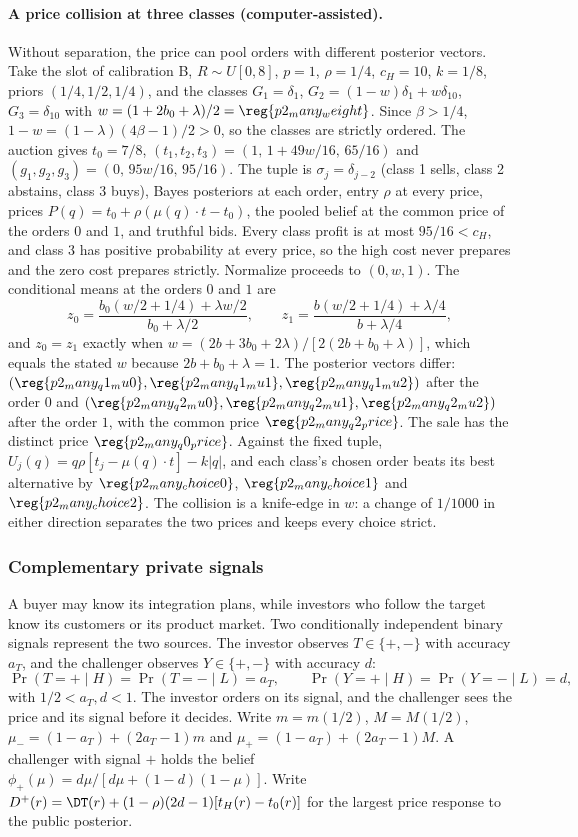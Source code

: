 \paragraph{A price collision at three classes (computer-assisted).}
Without separation, the price can pool orders with different posterior vectors. Take the slot of calibration B,
\(R\sim U[0,8]\), \(p=1\), \(\rho=1/4\), \(c_H=10\), \(k=1/8\), priors \((1/4,1/2,1/4)\), and the classes
\(G_1=\delta_1\), \(G_2=(1-w)\delta_1+w\delta_{10}\), \(G_3=\delta_{10}\) with \(w=(1+2b_0+\lambda)/2=\reg{p2_many_weight}\).
Since \(\beta>1/4\), \(1-w=(1-\lambda)(4\beta-1)/2>0\), so the classes are strictly ordered. The auction gives
\(t_0=7/8\), \((t_1,t_2,t_3)=(1,\,1+49w/16,\,65/16)\) and \((g_1,g_2,g_3)=(0,\,95w/16,\,95/16)\). The tuple is
\(\sigma_j=\delta_{j-2}\) (class 1 sells, class 2 abstains, class 3 buys), Bayes posteriors at each order, entry \(\rho\)
at every price, prices \(P(q)=t_0+\rho(\mu(q)\cdot t-t_0)\), the pooled belief at the common price of the orders \(0\)
and \(1\), and truthful bids. Every class profit is at most \(95/16<c_H\), and class 3 has positive probability at every
price, so the high cost never prepares and the zero cost prepares strictly. Normalize proceeds to \((0,w,1)\). The
conditional means at the orders \(0\) and \(1\) are
\[
z_0=\frac{b_0(w/2+1/4)+\lambda w/2}{b_0+\lambda/2},\qquad z_1=\frac{b(w/2+1/4)+\lambda/4}{b+\lambda/4},
\]
and \(z_0=z_1\) exactly when \(w=(2b+3b_0+2\lambda)/[2(2b+b_0+\lambda)]\), which equals the stated \(w\) because
\(2b+b_0+\lambda=1\). The posterior vectors differ: \((\reg{p2_many_q1_mu0},\reg{p2_many_q1_mu1},\reg{p2_many_q1_mu2})\)
after the order \(0\) and \((\reg{p2_many_q2_mu0},\reg{p2_many_q2_mu1},\reg{p2_many_q2_mu2})\) after the order \(1\),
with the common price \(\reg{p2_many_q2_price}\). The sale has the distinct price \(\reg{p2_many_q0_price}\). Against
the fixed tuple, \(U_j(q)=q\rho[t_j-\mu(q)\cdot t]-k|q|\), and each class's chosen order beats its best alternative
by \(\reg{p2_many_choice0}\), \(\reg{p2_many_choice1}\) and \(\reg{p2_many_choice2}\). The collision is a knife-edge in
\(w\): a change of \(1/1000\) in either direction separates the two prices and keeps every choice strict.

\subsubsection*{Complementary private signals}

A buyer may know its integration plans, while investors who follow the target know its customers or its product
market. Two conditionally independent binary signals represent the two sources. The investor observes
\(T\in\{+,-\}\) with accuracy \(a_T\), and the challenger observes \(Y\in\{+,-\}\) with accuracy \(d\):
\[
\Pr(T=+\mid H)=\Pr(T=-\mid L)=a_T,\qquad \Pr(Y=+\mid H)=\Pr(Y=-\mid L)=d,
\]
with \(1/2<a_T,d<1\).
The investor orders on its signal, and the challenger sees the price and its signal before it decides. Write
\(m=m(1/2)\), \(M=M(1/2)\), \(\mu_-=(1-a_T)+(2a_T-1)m\) and \(\mu_+=(1-a_T)+(2a_T-1)M\). A challenger with signal
\(+\) holds the belief \(\phi_+(\mu)=d\mu/[d\mu+(1-d)(1-\mu)]\). Write
\(D^+(r)=\DT(r)+(1-\rho)(2d-1)[t_H(r)-t_0(r)]\) for the largest price response to the public posterior.

